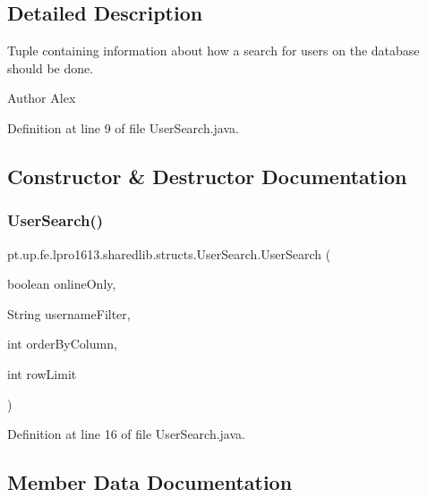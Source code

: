\subsection{Detailed Description}
Tuple containing information about how a search for users on the database should be done.

\begin{DoxyAuthor}{Author}
Alex 
\end{DoxyAuthor}


Definition at line 9 of file User\+Search.\+java.



\subsection{Constructor \& Destructor Documentation}
\hypertarget{classpt_1_1up_1_1fe_1_1lpro1613_1_1sharedlib_1_1structs_1_1_user_search_aa6926beb7f6930d9eb5413ee860d50e3}{}\label{classpt_1_1up_1_1fe_1_1lpro1613_1_1sharedlib_1_1structs_1_1_user_search_aa6926beb7f6930d9eb5413ee860d50e3} 
\subsubsection{\texorpdfstring{User\+Search()}{UserSearch()}}
{\footnotesize\ttfamily pt.\+up.\+fe.\+lpro1613.\+sharedlib.\+structs.\+User\+Search.\+User\+Search (\begin{DoxyParamCaption}\item[{boolean}]{online\+Only,  }\item[{String}]{username\+Filter,  }\item[{int}]{order\+By\+Column,  }\item[{int}]{row\+Limit }\end{DoxyParamCaption})}



Definition at line 16 of file User\+Search.\+java.



\subsection{Member Data Documentation}
\hypertarget{classpt_1_1up_1_1fe_1_1lpro1613_1_1sharedlib_1_1structs_1_1_user_search_a6fd03f781a5566c3e43a48230ab69681}{}\label{classpt_1_1up_1_1fe_1_1lpro1613_1_1sharedlib_1_1structs_1_1_user_search_a6fd03f781a5566c3e43a48230ab69681} 
